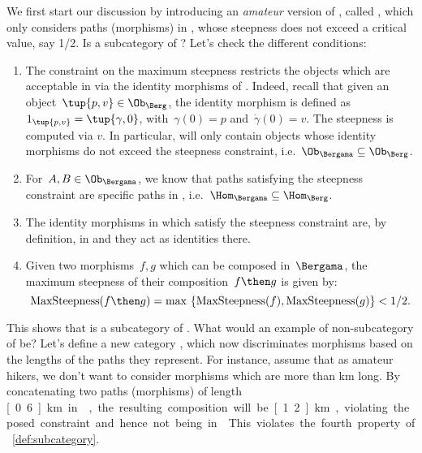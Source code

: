 We first start our discussion by introducing an \emph{amateur} version of \Berg, called \Bergama, which only considers paths (morphisms) in \Berg, whose steepness does not exceed a critical value, say 1/2. Is \Bergama a subcategory of \Berg? Let's check the different conditions:
\begin{enumerate}
    \item The constraint on the maximum steepness restricts the objects which are acceptable in \Bergama via the identity morphisms of \Berg. Indeed, recall that given an object~$\tup{p,v}\in \Ob_{\Berg}$, the identity morphism is defined as~$1_{\tup{p,v}}=\tup{\gamma,0}$, with~$\gamma(0)=p$ and~$\dot{\gamma}(0)=v$. The steepness is computed via $v$. In particular, \Bergama will only contain objects whose identity morphisms do not exceed the steepness constraint, i.e.~$\Ob_\Bergama \subseteq \Ob_\Berg$.
    \item For~$A,B\in \Ob_{\Bergama}$, we know that paths satisfying the steepness constraint are specific paths in \Berg, i.e.~$\Hom_{\Bergama}\subseteq \Hom_{\Berg}$.
    \item The identity morphisms in \Berg which satisfy the steepness constraint are, by definition, in \Bergama and they act as identities there.
    \item Given two morphisms~$f,g$ which can be composed in~$\Bergama$, the maximum steepness of their composition~$f\then g$ is given by:
    \begin{equation*}
        \text{MaxSteepness}(f\then g)=\max \ \{\text{MaxSteepness}(f),\text{MaxSteepness}(g)\}<1/2.
    \end{equation*}
\end{enumerate}

This shows that \Bergama is a subcategory of \Berg. What would an example of non-subcategory of \Berg be? Let's define a new category \Berglazy, which now discriminates morphisms based on the lengths of the paths they represent. For instance, assume that as amateur hikers, we don't want to consider morphisms which are more than \unit[1]{km} long. By concatenating two paths (morphisms) of length \unit[0.6]{km} in \Berglazy, the resulting composition will be \unit[1.2]{km}, violating the posed constraint and hence not being in \Berglazy. This violates the fourth property of \cref{def:subcategory}.



